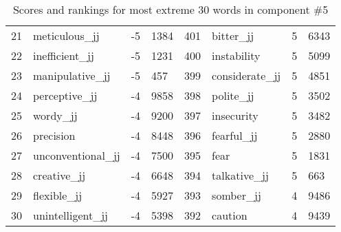 \begin{table}[tbp]
\begin{tabular}{| rlr@{.}l | rlr@{.}l |}
    21 & meticulous\_jj & -5 & 1384    &    401 & bitter\_jj & 5 & 6343 \\
    22 & inefficient\_jj & -5 & 1231    &    400 & instability & 5 & 5099 \\
    23 & manipulative\_jj & -5 & 457    &    399 & considerate\_jj & 5 & 4851 \\
    24 & perceptive\_jj & -4 & 9858    &    398 & polite\_jj & 5 & 3502 \\
    25 & wordy\_jj & -4 & 9200    &    397 & insecurity & 5 & 3482 \\
    26 & precision & -4 & 8448    &    396 & fearful\_jj & 5 & 2880 \\
    27 & unconventional\_jj & -4 & 7500    &    395 & fear & 5 & 1831 \\
    28 & creative\_jj & -4 & 6648    &    394 & talkative\_jj & 5 & 663 \\
    29 & flexible\_jj & -4 & 5927    &    393 & somber\_jj & 4 & 9486 \\
    30 & unintelligent\_jj & -4 & 5398    &    392 & caution & 4 & 9439 \\
    \hline
    \end{tabular}
    \caption{Scores and rankings for most extreme 30 words in component \#5} 
\end{table}
\clearpage
